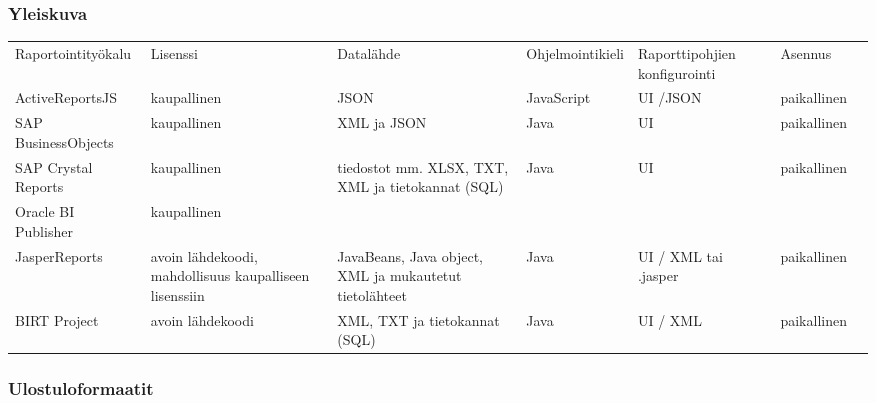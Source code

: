 \subsubsection{Yleiskuva}

\begin{table}[]
\begin{tabular}{lllllll}
Raportointityökalu  & Lisenssi                                               & Datalähde                                              & Ohjelmointikieli & Raporttipohjien konfigurointi & Asennus     &  \\
ActiveReportsJS     & kaupallinen                                            & JSON                                                   & JavaScript       & UI /JSON                      & paikallinen &  \\
SAP BusinessObjects & kaupallinen                                            & XML ja JSON                                            & Java             & UI                            & paikallinen &  \\
SAP Crystal Reports & kaupallinen                                            & tiedostot mm. XLSX, TXT, XML ja tietokannat (SQL)      & Java             & UI                            & paikallinen &  \\
Oracle BI Publisher & kaupallinen                                            &                                                        &                  &                               &             &  \\
JasperReports       & avoin lähdekoodi, mahdollisuus kaupalliseen lisenssiin & JavaBeans, Java object, XML ja mukautetut tietolähteet & Java             & UI / XML tai .jasper          & paikallinen &  \\
BIRT Project        & avoin lähdekoodi                                       & XML, TXT ja tietokannat (SQL)                          & Java             & UI / XML                      & paikallinen & 
\end{tabular}
\end{table}

\subsubsection{Ulostuloformaatit}

